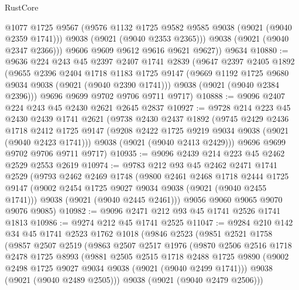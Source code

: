 \begin{lexlean}{RustCore}
\begin{coremodule}
            @1077
            @1725
            @9567
            (@9576 @1132 @1725 @9582 @9585 @9038 (@9021 (@9040 @2359 @1741)))
            @9038
            (@9021 (@9040 @2353 @2365)))
          @9038
          (@9021 (@9040 @2347 @2366)))
        @9606
        @9609
        @9612
        @9616
        @9621
        @9627))
    @9634
@10880 := @9636
    @224
    @243
    @45
    @2397
    @2407
    @1741
    @2839
    (@9647
      @2397
      @2405
      @1892
      (@9655
        @2396
        @2404
        @1718
        @1183
        @1725
        @9147
        (@9669 @1192 @1725 @9680 @9034 @9038 (@9021 (@9040 @2390 @1741)))
        @9038
        (@9021 (@9040 @2384 @2396)))
      @9696
      @9699
      @9702
      @9706
      @9711
      @9717)
@10888 := @9096 @2407 @224 @243 @45 @2430 @2621 @2645 @2837
@10927 := @9728
    @214
    @223
    @45
    @2430
    @2439
    @1741
    @2621
    (@9738
      @2430
      @2437
      @1892
      (@9745
        @2429
        @2436
        @1718
        @2412
        @1725
        @9147
        (@9208 @2422 @1725 @9219 @9034 @9038 (@9021 (@9040 @2423 @1741)))
        @9038
        (@9021 (@9040 @2413 @2429)))
      @9696
      @9699
      @9702
      @9706
      @9711
      @9717)
@10935 := @9096 @2439 @214 @223 @45 @2462 @2529 @2553 @2619
@10974 := @9783
    @212
    @93
    @45
    @2462
    @2471
    @1741
    @2529
    (@9793
      @2462
      @2469
      @1748
      (@9800
        @2461
        @2468
        @1718
        @2444
        @1725
        @9147
        (@9002 @2454 @1725 @9027 @9034 @9038 (@9021 (@9040 @2455 @1741)))
        @9038
        (@9021 (@9040 @2445 @2461)))
      @9056
      @9060
      @9065
      @9070
      @9076
      @9085)
@10982 := @9096 @2471 @212 @93 @45 @1741 @2526 @1741 @1813
@10986 := @9274 @212 @45 @1741 @2525
@11047 := @9284
    @210
    @142
    @34
    @45
    @1741
    @2523
    @1762
    @1018
    (@9846
      @2523
      (@9851
        @2521
        @1758
        (@9857
          @2507
          @2519
          (@9863
            @2507
            @2517
            @1976
            (@9870
              @2506
              @2516
              @1718
              @2478
              @1725
              @8993
              (@9881
                @2505
                @2515
                @1718
                @2488
                @1725
                @9890
                (@9002 @2498 @1725 @9027 @9034 @9038 (@9021 (@9040 @2499 @1741)))
                @9038
                (@9021 (@9040 @2489 @2505)))
              @9038
              (@9021 (@9040 @2479 @2506)))

\end{coremodule}
\end{lexlean}
